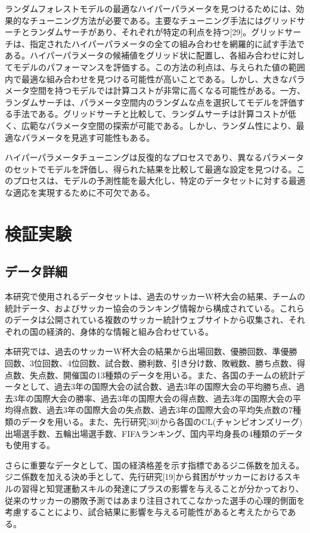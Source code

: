 \documentclass[platex]{suribt}
\begin{document}
ランダムフォレストモデルの最適なハイパーパラメータを見つけるためには、効果的なチューニング方法が必要である。主要なチューニング手法にはグリッドサーチとランダムサーチがあり、それぞれが特定の利点を持つ[29]。グリッドサーチは、指定されたハイパーパラメータの全ての組み合わせを網羅的に試す手法である。ハイパーパラメータの候補値をグリッド状に配置し、各組み合わせに対してモデルのパフォーマンスを評価する。この方法の利点は、与えられた値の範囲内で最適な組み合わせを見つける可能性が高いことである。しかし、大きなパラメータ空間を持つモデルでは計算コストが非常に高くなる可能性がある。一方、ランダムサーチは、パラメータ空間内のランダムな点を選択してモデルを評価する手法である。グリッドサーチと比較して、ランダムサーチは計算コストが低く、広範なパラメータ空間の探索が可能である。しかし、ランダム性により、最適なパラメータを見逃す可能性もある。

ハイパーパラメータチューニングは反復的なプロセスであり、異なるパラメータのセットでモデルを評価し、得られた結果を比較して最適な設定を見つける。このプロセスは、モデルの予測性能を最大化し、特定のデータセットに対する最適な適応を実現するために不可欠である。


\chapter{検証実験}
\section{データ詳細}
本研究で使用されるデータセットは、過去のサッカーW杯大会の結果、チームの統計データ、およびサッカー協会のランキング情報から構成されている。これらのデータは公開されている複数のサッカー統計ウェブサイトから収集され、それぞれの国の経済的、身体的な情報と組み合わせている。

本研究では、過去のサッカーW杯大会の結果から出場回数、優勝回数、準優勝回数、3位回数、4位回数、試合数、勝利数、引き分け数、敗戦数、勝ち点数、得点数、失点数、開催国の13種類のデータを用いる。また、各国のチームの統計データとして、過去3年の国際大会の試合数、過去3年の国際大会の平均勝ち点、過去3年の国際大会の勝率、過去3年の国際大会の得点数、過去3年の国際大会の平均得点数、過去3年の国際大会の失点数、過去3年の国際大会の平均失点数の7種類のデータを用いる。また、先行研究[30]から各国のCL(チャンピオンズリーグ)出場選手数、五輪出場選手数、FIFAランキング、国内平均身長の4種類のデータも使用する。

さらに重要なデータとして、国の経済格差を示す指標であるジニ係数を加える。ジニ係数を加える決め手として、先行研究[19]から貧困がサッカーにおけるスキルの習得と知覚運動スキルの発達にプラスの影響を与えることが分かっており、従来のサッカーの勝敗予測ではあまり注目されてこなかった選手の心理的側面を考慮することにより、試合結果に影響を与える可能性があると考えたからである。
\end{document}
